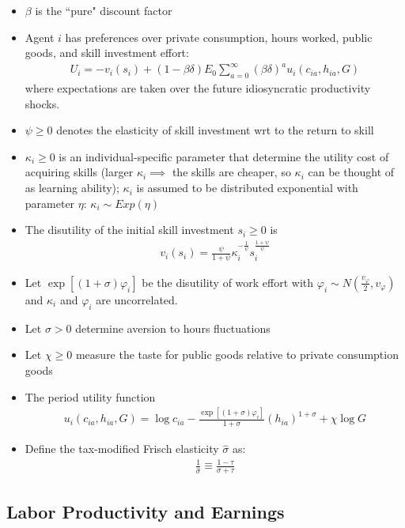\documentclass{article}
\begin{document}
\begin{itemize}
\item $\beta$ is the ``pure" discount factor
\item Agent $i$ has preferences over private consumption, hours worked, public goods, and skill investment effort:
\begin{align}
U_i = - v_i(s_i) + (1 - \beta \delta) E_0 \sum_{a = 0}^\infty (\beta \delta)^a u_i(c_{ia}, h_{ia}, G) \label{utility}
\end{align}
where expectations are taken over the future idiosyncratic productivity shocks.
\item $\psi \ge 0$ denotes the elasticity of skill investment wrt to the return to skill
\item $\kappa_i \ge 0$ is an individual-specific parameter that determine the utility cost of acquiring skills (larger $\kappa_i \implies$ the skills are cheaper, so $\kappa_i$ can be thought of as learning ability); $\kappa_i$ is assumed to be distributed exponential with parameter $\eta$: $\kappa_i \sim Exp(\eta)$
\item The disutility of the initial skill investment $s_i \ge 0$ is
\begin{align}
v_i(s_i) = \frac{\psi}{1 + \psi} \kappa_i^{-\frac{1}{\psi}} s_i^\frac{1 + \psi}{\psi} \label{disutility_skill}
\end{align}
\item Let $\exp[(1+\sigma) \varphi_i]$ be the disutility of work effort with $\varphi_i \sim N(\frac{v_\varphi}{2}, v_\varphi)$ and $\kappa_i$ and $\varphi_i$ are uncorrelated.
\item Let $\sigma > 0$ determine aversion to hours fluctuations
\item Let $\chi \ge 0$ measure the taste for public goods relative to private consumption goods
\item The period utility function
\begin{align}
u_i(c_{ia}, h_{ia}, G) = \log c_{ia} - \frac{\exp [(1+\sigma) \varphi_i] }{1 + \sigma} (h_{ia})^{1 + \sigma} + \chi \log G
\end{align}
\item Define the tax-modified Frisch elasticity $\hat \sigma$ as:
\begin{align}
\frac{1}{\hat \sigma} \equiv \frac{1 - \tau}{\sigma + \tau}
\end{align}
\end{itemize}



\subsection{Labor Productivity and Earnings}
\end{document}

